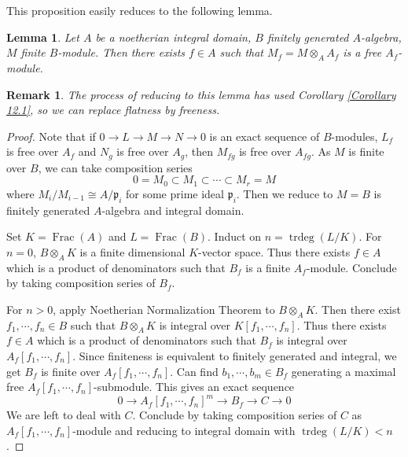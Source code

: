 \documentclass{ctexart}
\newtheorem{remark}{Remark}[section]
\newtheorem{lemma}{Lemma}[section]
\newcommand{\trdeg}{\operatorname{trdeg}}
\newcommand{\fraction}{\operatorname{Frac}}
\begin{document}
This proposition easily reduces to the following lemma.
\begin{lemma}
    Let $A$ be a noetherian integral domain, $B$ finitely generated $A$-algebra, $M$ finite $B$-module.
    Then there exists $f\in A$ such that $M_{f} = M \otimes_{A} A_{f}$ is a free $A_{f}$-module.
\end{lemma}
\begin{remark}
    The process of reducing to this lemma has used Corollary \ref{Corollary 12.1},
    so we can replace flatness by freeness.
\end{remark}
\begin{proof}
    Note that if $0 \longrightarrow L \longrightarrow M \longrightarrow N \longrightarrow 0$ is an exact sequence of $B$-modules, 
    $L_{f}$ is free over $A_{f}$ and $N_{g}$ is free over $A_{g}$, then $M_{fg}$ is free over $A_{fg}$.
    As $M$ is finite over $B$, we can take composition series
    \begin{equation*}
        0 = M_{0} \subset M_{1} \subset \cdots \subset M_{r} = M
    \end{equation*} 
    where $M_{i}/M_{i - 1} \cong A/\mathfrak{p}_{i}$ for some prime ideal $\mathfrak{p}_{i}$.
    Then we reduce to $M = B$ is finitely generated $A$-algebra and integral domain.
    \par
    Set $K = \fraction(A)$ and $L = \fraction(B)$.
    Induct on $n = \trdeg(L/K)$.
    For $n = 0$, $B \otimes_{A} K$ is a finite dimensional $K$-vector space.
    Thus there exists $f\in A$ which is a product of denominators such that $B_{f}$ is a finite $A_{f}$-module.
    Conclude by taking composition series of $B_{f}$.
    \par
    For $n > 0$, apply Noetherian Normalization Theorem to $B \otimes_{A} K$.
    Then there exist $f_{1}, \cdots, f_{n}\in B$ such that $B \otimes_{A} K$ is integral over $K[f_{1}, \cdots, f_{n}]$.
    Thus there exists $f\in A$ which is a product of denominators such that $B_{f}$ is integral over $A_{f}[f_{1}, \cdots, f_{n}]$.
    Since finiteness is equivalent to finitely generated and integral, we get $B_{f}$ is finite over $A_{f}[f_{1}, \cdots, f_{n}]$.
    Can find $b_{1}, \cdots, b_{m}\in B_{f}$ generating a maximal free $A_{f}[f_{1}, \cdots, f_{n}]$-submodule.
    This gives an exact sequence
    \begin{equation*}
        0 \longrightarrow A_{f}[f_{1}, \cdots, f_{n}]^{m} \longrightarrow B_{f} \longrightarrow C \longrightarrow 0
    \end{equation*}
    We are left to deal with $C$.
    Conclude by taking composition series of $C$ as $A_{f}[f_{1}, \cdots, f_{n}]$-module and reducing to integral domain with $\trdeg(L/K) < n$.
\end{proof}
\end{document}
